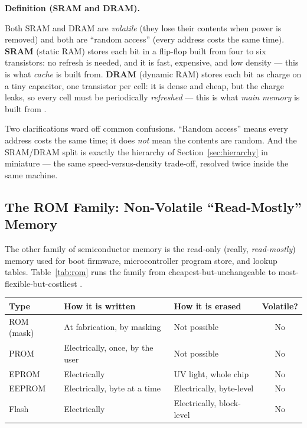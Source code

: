\documentclass[11pt]{article}
\newenvironment{definitionbox}[1]{%
  \par\noindent\textbf{Definition (#1).}\ \itshape
}{\par\vspace{0.3em}}
\begin{document}
\begin{definitionbox}{SRAM and DRAM}
Both SRAM and DRAM are \emph{volatile} (they lose their contents when power is removed) and both are ``random access'' (every address costs the same time). \textbf{SRAM} (static RAM) stores each bit in a flip-flop built from four to six transistors: no refresh is needed, and it is fast, expensive, and low density --- this is what \emph{cache} is built from. \textbf{DRAM} (dynamic RAM) stores each bit as charge on a tiny capacitor, one transistor per cell: it is dense and cheap, but the charge leaks, so every cell must be periodically \emph{refreshed} --- this is what \emph{main memory} is built from \cite[\S6.1, PDF pp.~226--236]{Stallings2015_computer_organization}.
\end{definitionbox}

Two clarifications ward off common confusions. ``Random access'' means every address costs the same time; it does \emph{not} mean the contents are random. And the SRAM/DRAM split is exactly the hierarchy of Section~\ref{sec:hierarchy} in miniature --- the same speed-versus-density trade-off, resolved twice inside the same machine.

\subsection{The ROM Family: Non-Volatile ``Read-Mostly'' Memory}

The other family of semiconductor memory is the read-only (really, \emph{read-mostly}) memory used for boot firmware, microcontroller program store, and lookup tables. Table~\ref{tab:rom} runs the family from cheapest-but-unchangeable to most-flexible-but-costliest \cite[\S6.1, PDF pp.~226--236]{Stallings2015_computer_organization}.

\begin{center}
\footnotesize
\begin{tabular}{@{}lllc@{}}
  \toprule
  \textbf{Type} & \textbf{How it is written} & \textbf{How it is erased} & \textbf{Volatile?} \\
  \midrule
  ROM (mask)  & At fabrication, by masking      & Not possible               & No \\
  PROM        & Electrically, once, by the user & Not possible               & No \\
  EPROM       & Electrically                    & UV light, whole chip       & No \\
  EEPROM      & Electrically, byte at a time    & Electrically, byte-level   & No \\
  Flash       & Electrically                    & Electrically, block-level  & No \\
  \bottomrule
\end{tabular}
\label{tab:rom}
\end{center}
\end{document}
